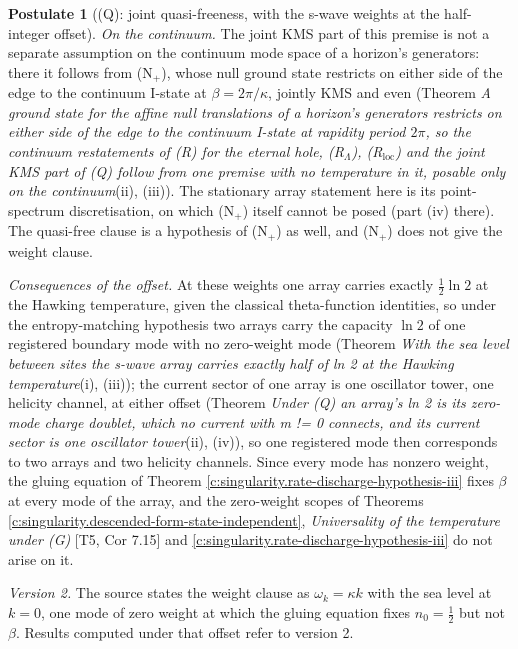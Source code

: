 \documentclass[11pt]{article}
\theoremstyle{definition}
\newtheorem{postulate}[theorem]{Postulate}
\theoremstyle{plain}
\begin{document}
\begin{postulate}[(Q): joint quasi-freeness, with the s-wave weights at the half-integer offset]
\emph{On the continuum.} The joint KMS part of this premise is not a separate assumption on the continuum mode space of a horizon's generators: there it follows from (N$_{+}$), whose null ground state restricts on either side of the edge to the continuum I-state at $\beta = 2\pi/\kappa$, jointly KMS and even (Theorem \emph{A ground state for the affine null translations of a horizon's generators restricts on either side of the edge to the continuum I-state at rapidity period $2\pi$, so the continuum restatements of (R) for the eternal hole, (R$_{\Lambda}$), (R$_{\mathrm{loc}}$) and the joint KMS part of (Q) follow from one premise with no temperature in it, posable only on the continuum}(ii), (iii)). The stationary array statement here is its point-spectrum discretisation, on which (N$_{+}$) itself cannot be posed (part (iv) there). The quasi-free clause is a hypothesis of (N$_{+}$) as well, and (N$_{+}$) does not give the weight clause.

\emph{Consequences of the offset.} At these weights one array carries exactly $\tfrac12\ln 2$ at the Hawking temperature, given the classical theta-function identities, so under the entropy-matching hypothesis two arrays carry the capacity $\ln 2$ of one registered boundary mode with no zero-weight mode (Theorem \emph{With the sea level between sites the s-wave array carries exactly half of ln 2 at the Hawking temperature}(i), (iii)); the current sector of one array is one oscillator tower, one helicity channel, at either offset (Theorem \emph{Under (Q) an array's ln 2 is its zero-mode charge doublet, which no current with m != 0 connects, and its current sector is one oscillator tower}(ii), (iv)), so one registered mode then corresponds to two arrays and two helicity channels. Since every mode has nonzero weight, the gluing equation of Theorem \ref{c:singularity.rate-discharge-hypothesis-iii} fixes $\beta$ at every mode of the array, and the zero-weight scopes of Theorems \ref{c:singularity.descended-form-state-independent}, \emph{Universality of the temperature under (G)} [T5, Cor 7.15] and \ref{c:singularity.rate-discharge-hypothesis-iii} do not arise on it.

\emph{Version 2.} The source states the weight clause as $\omega_k = \kappa k$ with the sea level at $k = 0$, one mode of zero weight at which the gluing equation fixes $n_0 = \tfrac12$ but not $\beta$. Results computed under that offset refer to version 2.
\end{postulate}
\end{document}
